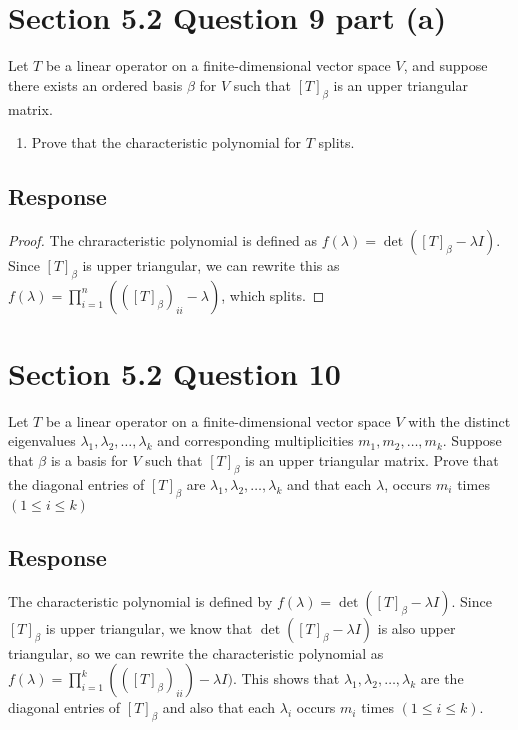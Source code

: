 \documentclass[13pt]{article}
\begin{document}
\newpage
\section*{Section 5.2 Question 9 part (a)}
Let $T$ be a linear operator on a finite-dimensional vector space $V$, and suppose there exists an ordered basis $\beta$ for $V$ such that $[T]_\beta$ is an upper triangular matrix.
\begin{enumerate}[label=(\alph*),leftmargin=*]
\item Prove that the characteristic polynomial for $T$ splits.
\end{enumerate}

\subsection*{Response}
\begin{proof}
  The chraracteristic polynomial is defined as $f(\lambda) = \det([T]_\beta - \lambda I)$. Since $[T]_\beta$ is upper triangular, we can rewrite this as $f(\lambda) = \prod_{i = 1}^n(([T]_\beta)_{ii} - \lambda)$, which splits.  
\end{proof}





\newpage
\section*{Section 5.2 Question 10}
Let $T$ be a linear operator on a finite-dimensional vector space $V$ with the distinct eigenvalues $\lambda_1, \lambda_2, \ldots, \lambda_k$ and corresponding multiplicities $m_1, m_2, \ldots, m_k$. Suppose that $\beta$ is a basis for $V$ such that $[T]_\beta$ is an upper triangular matrix. Prove that the diagonal entries of $[T]_\beta$ are $\lambda_1, \lambda_2, \ldots, \lambda_k$ and that each $\lambda$, occurs $m_i$ times $(1 \leq i \leq k)$

\subsection*{Response}
The characteristic polynomial is defined by $f(\lambda) = \det([T]_\beta - \lambda I)$. Since $[T]_\beta$ is upper triangular, we know that $\det([T]_\beta - \lambda I)$ is also upper triangular, so we can rewrite the characteristic polynomial as $f(\lambda) = \prod_{i = 1}^k (([T]_\beta)_{ii}) - \lambda I)$. This shows that $\lambda_1, \lambda_2, \ldots, \lambda_k$ are the diagonal entries of $[T]_\beta$ and also that each $\lambda_i$ occurs $m_i$ times $(1 \leq i \leq k)$.
\end{document}
